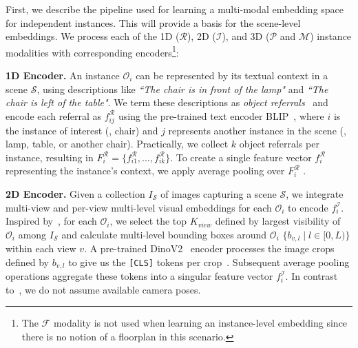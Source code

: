 First, we describe the pipeline used for learning a multi-modal embedding space for independent instances.
This will provide a basis for the scene-level embeddings. 
We process each of the 1D ($\mathcal{R}$), 2D ($\mathcal{I}$), and 3D ($\mathcal{P}$ and $\mathcal{M}$) instance modalities with corresponding encoders\footnote{The $\mathcal{F}$ modality is not used when learning an instance-level embedding since there is no notion of a floorplan in this scenario.}:

\noindent \textbf{1D Encoder.} 
An instance $\mathcal{O}_i$ can be represented by its textual context in a scene $\mathcal{S}$, using descriptions like \textit{``The chair is in front of the lamp"} and \textit{``The chair is left of the table"}. We term these descriptions as \textit{object referrals}~\cite{jia2024sceneverse} and encode each referral as $f_{ij}^\mathcal{R}$ using the pre-trained text encoder BLIP~\cite{Li2022BLIPBL}, where $i$ is the instance of interest (\eg, chair) and $j$ represents another instance in the scene (\eg, lamp, table, or another chair). Practically, we collect $k$ object referrals per instance, resulting in $F_i^\mathcal{R} = \{ f_{i1}^{\mathcal{R}}, \ldots, f_{ik}^{\mathcal{R}} \}$. To create a single feature vector $f_{i}^{\mathcal{R}}$ representing the instance’s context, we apply average pooling over $F_i^\mathcal{R}$ .

\noindent \textbf{2D Encoder.} Given a collection $I_\mathcal{S}$ of images capturing a scene $\mathcal{S}$, we integrate multi-view and per-view multi-level visual embeddings for each $\mathcal{O}_i$ to encode $f_i^\mathcal{I}$. Inspired by~\cite{miao2024scenegraphloc}, for each $\mathcal{O}_i$, we select the top $K_{view}$ defined by largest visibility of  $\mathcal{O}_i$ among $I_\mathcal{S}$ and calculate multi-level bounding boxes around $\mathcal{O}_i$ $\{b_{v,l} \; | \; l \in [0, L)\}$ within each view $v$. A pre-trained DinoV2~\cite{oquab2023dinov2, darcet2023vitneedreg} encoder processes the image crops defined by $b_{v,l}$ to give us the \texttt{[CLS]} tokens per crop~\cite{yang2024denoising}. Subsequent average pooling operations aggregate these tokens into a singular feature vector $f_i^\mathcal{I}$. In contrast to~\cite{miao2024scenegraphloc}, we do not assume available camera poses.

